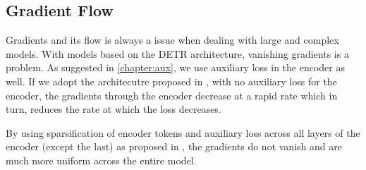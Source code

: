 \subsection{Gradient Flow}

\par Gradients and its flow is always a issue when dealing with large and complex models. With models based on the DETR \cite{carion2020detr} architecture, vanishing gradients is a problem. As suggested in \ref{chapter:aux}, we use auxiliary loss in the encoder as well. If we adopt the architecutre proposed in \cite{zhu2020deformable}, with no auxiliary loss for the encoder, the gradients through the encoder decrease at a rapid rate which in turn, reduces the rate at which the loss decreases. 
\par By using sparsification of encoder tokens and auxiliary loss across all layers of the encoder (except the last) as proposed in \cite{roh2021sparse}, the gradients do not vanish and are much more uniform across the entire model.

